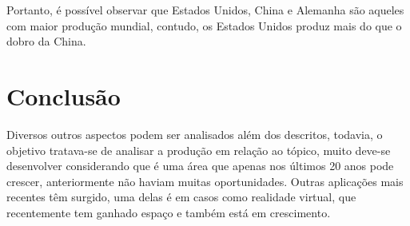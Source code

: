 Portanto, é possível observar que Estados Unidos, China e Alemanha são aqueles com maior produção mundial, contudo, os Estados Unidos produz mais do que o dobro da China.


\section{Conclusão}

Diversos outros aspectos podem ser analisados além dos descritos, todavia, o objetivo tratava-se de analisar a produção em relação ao tópico, muito deve-se desenvolver considerando que é uma área que apenas nos últimos 20 anos pode crescer, anteriormente não haviam muitas oportunidades. Outras aplicações mais recentes têm surgido, uma delas é em casos como realidade virtual, que recentemente tem ganhado espaço e também está em crescimento.